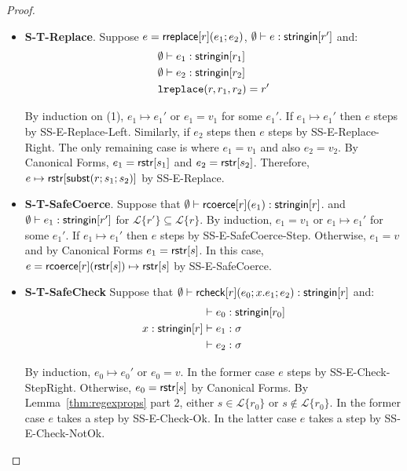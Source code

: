 \documentclass[11pt,leqno]{article}
\theoremstyle{definition}
\newcommand{\Lagr}{\mathcal{L}}
\newcommand{\lang}[1]{\Lagr\{#1\}}
\newcommand{\rcoerce}[2]{{\sf rcoerce}[#1](#2)}
\newcommand{\sistr}[1]{{\sf rstr}[#1]}   \newcommand{\rstr}[1]{{\sf rstr}[#1]} %
\newcommand{\rcheck}[4]{ {\sf rcheck}[#1](#2;#3;#4) }
\newcommand{\strin}[1]{\sistr{#1}}
\newcommand{\stringin}[1]{{\sf stringin}[#1]}
\newcommand{\lsubst}[3]{{\sf subst}(#1;#2;#3)} %
\newcommand{\lreplace}[3]{{\sf lreplace}(#1; #2; #3)}
\renewcommand{\lreplace}[3]{{\tt lreplace}(#1, #2, #3)}
\begin{document}
\begin{proof}
\begin{itemize}[label=$ $,itemsep=1ex]
\item \textbf{S-T-Replace}.
Suppose $e = {\sf rreplace}[r](e_1;e_2)$, $\emptyset\vdash e : \stringin{r'}$ and:
\begin{align}
&\emptyset\vdash e_1 : \stringin{r_1} \\
&\emptyset\vdash e_2 : \stringin{r_2} \\
&\lreplace{r}{r_1}{r_2} = r'
\end{align}

By induction on (1), $e_1 \mapsto e_1'$ or $e_1 = v_1$  for some $e_1'$.
If $e_1 \mapsto e_1'$ then $e$ steps by SS-E-Replace-Left.
Similarly, if $e_2$ steps then $e$ steps by SS-E-Replace-Right.
The only remaining case is where $e_1 = v_1$ and also $e_2 = v_2$.
By Canonical Forms, $e_1 = \strin{s_1}$ and $e_2 = \strin{s_2}$.
Therefore, $e \mapsto \rstr{\lsubst{r}{s_1}{s_2}}$ by SS-E-Replace.

\item \textbf{S-T-SafeCoerce}.
Suppose that $\emptyset\vdash \rcoerce{r}{e_1} : \stringin{r}$.
and
$\emptyset\vdash e_1 : \stringin{r'}$ for $\lang{r'} \subseteq \lang{r}$.%
By induction, $e_1 =v_1$ or $e_1 \mapsto e_1'$ for some $e_1'$.
If $e_1 \mapsto e_1'$ then $e$ steps by SS-E-SafeCoerce-Step.
Otherwise, $e_1 =v$ and by Canonical Forms $e_1 = \rstr{s}$.
In this case, $e = \rcoerce{r}{\rstr{s}} \mapsto \rstr{s}$ by SS-E-SafeCoerce.

\item \textbf{S-T-SafeCheck}
Suppose that $\emptyset\vdash \rcheck{r}{e_0}{x.e_1}{e_2} : \stringin{r}$ and:
\begin{align}
&\vdash e_0 : \stringin{r_0}  \\
x:\stringin{r} &\vdash e_1 : \sigma \\
&\vdash e_2 : \sigma \label{align6}
\end{align}

By induction,  $e_0 \mapsto e_0'$ or $e_0 = v$.
In the former case $e$ steps by SS-E-Check-StepRight.
Otherwise, $e_0 = \rstr{s}$ by Canonical Forms.
By Lemma~\ref{thm:regexprops} part 2, either $s \in \lang{r_0}$ or $s \not\in\lang{r_0}$.
In the former case $e$ takes a step by SS-E-Check-Ok.
In the latter case $e$ takes a step by SS-E-Check-NotOk.

\end{itemize}

\end{proof}
\end{document}
